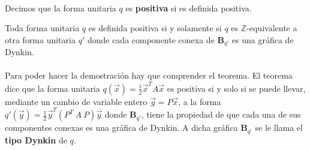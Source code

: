\paragraph*{}
Decimos que la forma unitaria $q$ es \textbf{positiva} si es definida positiva.

\begin{theorem}
Toda forma unitaria $q$ es definida positiva si y solamente si $q$ es $\mathbb{Z}$-equivalente a otra forma unitaria $q'$ donde cada componente conexa de $\textbf{B}_{q'}$ es una gráfica de Dynkin.
\label{teorema:1.6}
\end{theorem}

\paragraph{}
Para poder hacer la demostración hay que comprender el teorema. El teorema dice que la forma unitaria $q(\overrightarrow{x}) = \frac{1}{2}\overrightarrow{x}^{T}A\overrightarrow{x}$ es positiva si y solo si se puede llevar, mediante un cambio de variable entero $\overrightarrow{y} = P\overrightarrow{x}$, a la forma $q'(\overrightarrow{y}) = \frac{1}{2}\overrightarrow{y}^{T}\left(P^{T}~A~P\right)\overrightarrow{y}$ donde $\textbf{B}_{q'}$, tiene la propiedad de que cada una de sus componentes conexas es una gráfica de Dynkin. A dicha gráfica $\textbf{B}_{q'}$ se le llama el \textbf{tipo Dynkin} de $q$.

